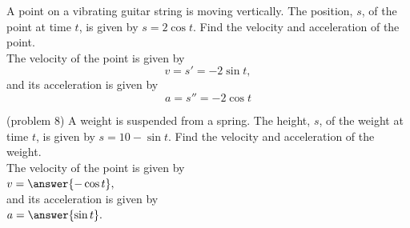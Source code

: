 \documentclass[handout]{ximera}
\begin{document}
\begin{foldable}
\end{foldable}



\begin{example}[example 8]
A point on a vibrating guitar string is moving vertically.
The position, $s$, of the point at time $t$, is given by $s = 2\cos t$.  Find the velocity and acceleration of the point.\\
The velocity of the point is given by 
\[
v = s' = -2\sin t,
\]
and its acceleration is given by 
\[
a = s'' = -2\cos t
\]

\end{example}

\begin{problem}(problem 8)
A weight is suspended from a spring.
The height, $s$, of the weight at time $t$, is given by $s = 10-\sin t$.  Find the velocity and acceleration of the weight.\\
The velocity of the point is given by\\
 $v = \answer{ -\cos t},$ \\
and its acceleration is given by\\
 $a = \answer{\sin t}.$
\end{problem}
\end{document}
